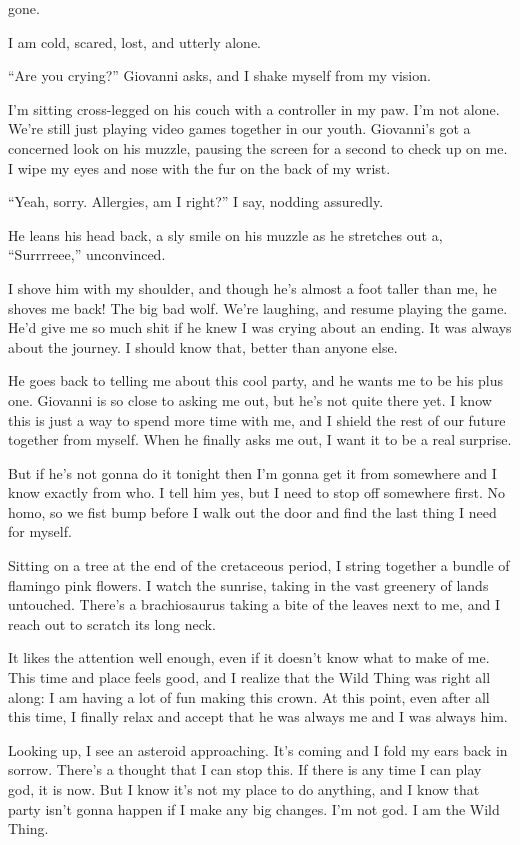 gone.

I am cold, scared, lost, and utterly alone.

``Are you crying?'' Giovanni asks, and I shake myself from my vision.

I'm sitting cross-legged on his couch with a controller in my paw. I'm
not alone. We're still just playing video games together in our youth.
Giovanni's got a concerned look on his muzzle, pausing the screen for a
second to check up on me. I wipe my eyes and nose with the fur on the
back of my wrist.

``Yeah, sorry. Allergies, am I right?'' I say, nodding assuredly.

He leans his head back, a sly smile on his muzzle as he stretches out a,
``Surrrreee,'' unconvinced.

I shove him with my shoulder, and though he's almost a foot taller than
me, he shoves me back! The big bad wolf. We're laughing, and resume
playing the game. He'd give me so much shit if he knew I was crying
about an ending. It was always about the journey. I should know that,
better than anyone else.

He goes back to telling me about this cool party, and he wants me to be
his plus one. Giovanni is so close to asking me out, but he's not quite
there yet. I know this is just a way to spend more time with me, and I
shield the rest of our future together from myself. When he finally asks
me out, I want it to be a real surprise.

But if he's not gonna do it tonight then I'm gonna get it from somewhere
and I know exactly from who. I tell him yes, but I need to stop off
somewhere first. No homo, so we fist bump before I walk out the door and
find the last thing I need for myself.

Sitting on a tree at the end of the cretaceous period, I string together
a bundle of flamingo pink flowers. I watch the sunrise, taking in the
vast greenery of lands untouched. There's a brachiosaurus taking a bite
of the leaves next to me, and I reach out to scratch its long neck.

It likes the attention well enough, even if it doesn't know what to make
of me. This time and place feels good, and I realize that the Wild Thing
was right all along: I am having a lot of fun making this crown. At this
point, even after all this time, I finally relax and accept that he was
always me and I was always him.

Looking up, I see an asteroid approaching. It's coming and I fold my
ears back in sorrow. There's a thought that I can stop this. If there is
any time I can play god, it is now. But I know it's not my place to do
anything, and I know that party isn't gonna happen if I make any big
changes. I'm not god. I am the Wild Thing.

